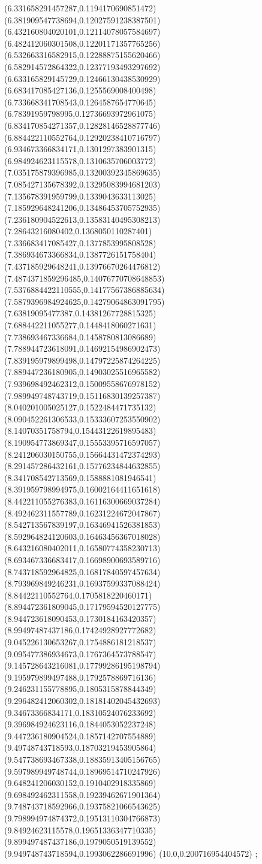 {(6.331658291457287,0.1194170690851472)
(6.381909547738694,0.12027591238387501)
(6.432160804020101,0.12114078057584697)
(6.482412060301508,0.12201171357765256)
(6.532663316582915,0.12288875155620466)
(6.582914572864322,0.12377193493297692)
(6.633165829145729,0.12466130438530929)
(6.683417085427136,0.1255569008400498)
(6.733668341708543,0.1264587654770645)
(6.78391959798995,0.12736693972961075)
(6.834170854271357,0.12828146528877746)
(6.884422110552764,0.12920238410716797)
(6.934673366834171,0.1301297383901315)
(6.984924623115578,0.1310635706003772)
(7.035175879396985,0.13200392345869635)
(7.085427135678392,0.13295083994681203)
(7.135678391959799,0.1339043633113025)
(7.185929648241206,0.13486453705752935)
(7.236180904522613,0.13583140495308213)
(7.28643216080402,0.1368050110287401)
(7.336683417085427,0.1377853995808528)
(7.386934673366834,0.1387726151758404)
(7.437185929648241,0.13976670264476812)
(7.4874371859296485,0.14076770708648853)
(7.5376884422110555,0.14177567386885634)
(7.5879396984924625,0.14279064863091795)
(7.63819095477387,0.14381267728815325)
(7.688442211055277,0.1448418060271631)
(7.738693467336684,0.1458780813086689)
(7.788944723618091,0.14692154986902473)
(7.839195979899498,0.14797225874264225)
(7.889447236180905,0.14903025516965582)
(7.939698492462312,0.15009558676978152)
(7.989949748743719,0.15116830139257387)
(8.040201005025127,0.1522484471735132)
(8.090452261306533,0.15333607253550902)
(8.14070351758794,0.15443122619895483)
(8.190954773869347,0.15553395716597057)
(8.241206030150755,0.15664431472374293)
(8.291457286432161,0.15776234844632855)
(8.341708542713569,0.1588881081946541)
(8.391959798994975,0.16002164411651618)
(8.442211055276383,0.16116300669037284)
(8.492462311557789,0.16231224672047867)
(8.542713567839197,0.16346941526381853)
(8.592964824120603,0.16463456367018028)
(8.643216080402011,0.16580774358230713)
(8.693467336683417,0.16698900693589716)
(8.743718592964825,0.16817840597457634)
(8.793969849246231,0.16937599337088424)
(8.84422110552764,0.1705818220460171)
(8.894472361809045,0.17179594520127775)
(8.944723618090453,0.1730184163420357)
(8.99497487437186,0.17424928927772682)
(9.045226130653267,0.1754886181218537)
(9.095477386934673,0.1767364573788547)
(9.145728643216081,0.17799286195198794)
(9.195979899497488,0.1792578869716136)
(9.246231155778895,0.1805315878844349)
(9.296482412060302,0.18181402045432693)
(9.34673366834171,0.18310524076233692)
(9.396984924623116,0.1844053052237248)
(9.447236180904524,0.1857142707554889)
(9.49748743718593,0.18703219453905864)
(9.547738693467338,0.18835913405156765)
(9.597989949748744,0.18969514710247926)
(9.648241206030152,0.1910402918335869)
(9.698492462311558,0.19239462671901364)
(9.748743718592966,0.19375821066543625)
(9.798994974874372,0.19513110304766873)
(9.84924623115578,0.19651336347710335)
(9.899497487437186,0.1979050519139552)
(9.949748743718594,0.1993062286691996)
(10.0,0.200716954404572)
};
